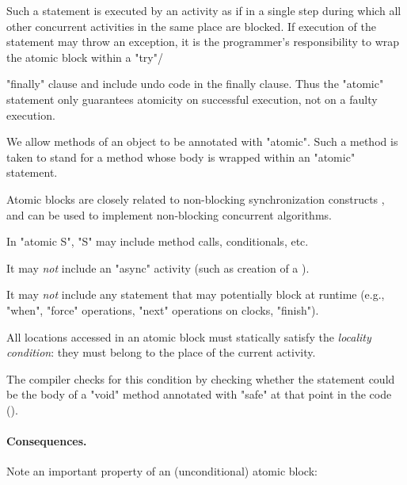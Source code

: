 Such a statement is executed by an activity as if in a single step
during which all other concurrent activities in the same place are
blocked. If execution of the statement may throw an exception, it is
the programmer's responsibility to wrap the atomic block within a
\xcd"try"/{\xcd"finally" clause and include undo code in the finally
clause. Thus the \xcd"atomic" statement only guarantees atomicity on
successful execution, not on a faulty execution.

We allow methods of an object to be annotated with \xcd"atomic". Such
a method is taken to stand for a method whose body is wrapped within an
\xcd"atomic" statement.

Atomic blocks are closely related to non-blocking synchronization
constructs \cite{herlihy91waitfree}, and can be used to implement 
non-blocking concurrent algorithms.

\begin{staticrule*}
In \xcd"atomic S", \xcd"S" may include method calls,
conditionals, etc.

It may {\em not} include an \xcd"async" activity (such as creation
of a ).

It may {\em not} include any statement that may potentially block at
runtime (e.g., \xcd"when", \xcd"force" operations, \xcd"next"
operations on clocks, \xcd"finish"). 

All locations accessed in an atomic block must statically satisfy the
{\em locality condition}: they must belong to the place of the current
activity.\label{LocalityCondition} 

\end{staticrule*}


The compiler checks for this condition by checking whether the statement
could be the body of a \xcd"void" method annotated with \xcd"safe" at
that point in the code ().

\paragraph{Consequences.}
Note an important property of an (unconditional) atomic block:

}
